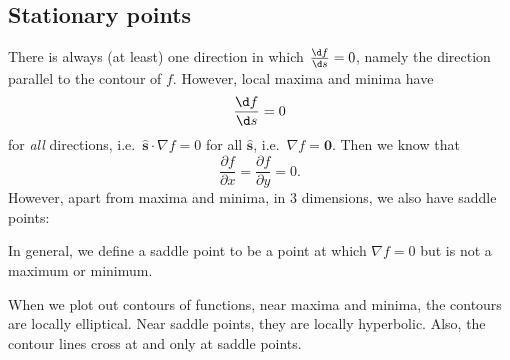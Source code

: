 \documentclass[a4paper]{article}
\begin{document}
\subsection{Stationary points}
There is always (at least) one direction in which $\frac{\d f}{\d s} = 0$, namely the direction parallel to the contour of $f$. However, local maxima and minima have
\[
  \frac{\d f}{\d s} = 0
\]
for \emph{all} directions, i.e.\ $\mathbf{\hat{s}}\cdot \nabla f = 0$ for all $\mathbf{\hat{s}}$, i.e.\ $\nabla f = \mathbf{0}$. Then we know that
\[
  \frac{\partial f}{\partial x} = \frac{\partial f}{\partial y} = 0.
\]
However, apart from maxima and minima, in 3 dimensions, we also have saddle points:
\begin{center}
\end{center}
In general, we define a saddle point to be a point at which $\nabla f = 0$ but is not a maximum or minimum.

When we plot out contours of functions, near maxima and minima, the contours are locally elliptical. Near saddle points, they are locally hyperbolic. Also, the contour lines cross at and only at saddle points.
\end{document}
